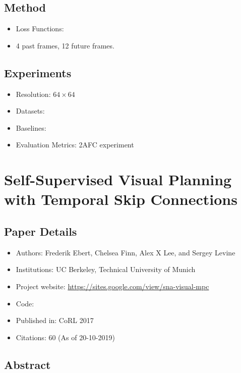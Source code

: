 \documentclass{article}
\begin{document}
    \subsection{Method}\label{subsec:Generating_the_Future_with_Adversarial_Transformers:method}
    \begin{itemize}
        \item Loss Functions:
        \item 4 past frames, 12 future frames.
    \end{itemize}

    \subsection{Experiments}\label{subsec:Generating_the_Future_with_Adversarial_Transformers:experiments}
    \begin{itemize}
        \item Resolution: $64 \times 64$
        \item Datasets:
        \item Baselines:
        \item Evaluation Metrics: 2AFC experiment
    \end{itemize}
    \newpage


    \section{Self-Supervised Visual Planning with Temporal Skip Connections}\label{sec:Self_Supervised_Visual_Planning_with_Temporal_Skip_Connections}
    \subsection*{Paper Details}
    \begin{itemize}
        \item Authors: Frederik Ebert, Chelsea Finn, Alex X Lee, and Sergey Levine
        \item Institutions: UC Berkeley, Technical University of Munich
        \item Project website: \url{https://sites.google.com/view/sna-visual-mpc}
        \item Code:
        \item Published in: CoRL 2017
        \item Citations: 60 (As of 20-10-2019)
    \end{itemize}

    \subsection*{Abstract}
\end{document}
